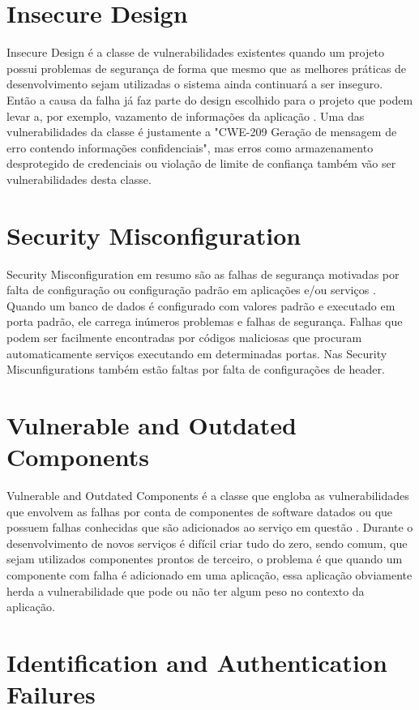 \section{Insecure Design}

Insecure Design é a classe de vulnerabilidades existentes quando um projeto possui problemas de segurança de forma que mesmo que as melhores práticas de desenvolvimento sejam utilizadas o sistema ainda continuará a ser inseguro. Então a causa da falha já faz parte do design escolhido para o projeto que podem levar a, por exemplo, vazamento de informações da aplicação \cite{9935837}. Uma das vulnerabilidades da classe é justamente a "CWE-209 Geração de mensagem de erro contendo informações confidenciais", mas erros como armazenamento desprotegido de credenciais ou violação de limite de confiança também vão ser vulnerabilidades desta classe.

\section{Security Misconfiguration}

Security Misconfiguration em resumo são as falhas de segurança motivadas por falta de configuração ou configuração padrão em aplicações e/ou serviços \cite{6045929}. Quando um banco de dados é configurado com valores padrão e executado em porta padrão, ele carrega inúmeros problemas e falhas de segurança. Falhas que podem ser facilmente encontradas por códigos maliciosas que procuram automaticamente serviços executando em determinadas portas. Nas Security Miscunfigurations também estão faltas por falta de configurações de header.

\section{Vulnerable and Outdated Components}

Vulnerable and Outdated Components é a classe que engloba as vulnerabilidades que envolvem as falhas por conta de componentes de software datados ou que possuem falhas conhecidas que são adicionados ao serviço em questão \cite{galvao2022analysis}. Durante o desenvolvimento de novos serviços é difícil criar tudo do zero, sendo comum, que sejam utilizados componentes prontos de terceiro, o problema é que quando um componente com falha é adicionado em uma aplicação, essa aplicação obviamente herda a vulnerabilidade que pode ou não ter algum peso no contexto da aplicação. 

\section{Identification and Authentication Failures}

